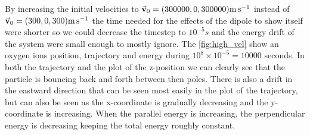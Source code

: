 \documentclass[x11names]{article}
\begin{document}
    By increasing the initial velocities to \(\va{v}_0 = (300000, 0, 300000) \si{\meter \per \second}\) instead of \(\va{v}_0 = (300, 0, 300) \si{\meter \per \second}\) the time needed for the effects of the dipole to show itself were shorter so we could decrease the timestep to \(10^{-5} \si{s}\) and the energy drift of the system were small enough to mostly ignore. The \cref{fig:high_vel} show an oxygen ions position, trajectory and energy during \(10^8\times 10^{-5} = 10000 \) seconds. In both the trajectory and the plot of the z-position we can clearly see that the particle is bouncing back and forth between then poles. There is also a drift in the eastward direction that can be seen most easily in the plot of the trajectory, but can also be seen as the x-coordinate is gradually decreasing and the y-coordinate is increasing.     When the parallel energy is increasing, the perpendicular energy is decreasing keeping the total energy roughly constant.
\end{document}
